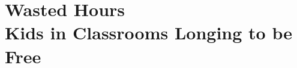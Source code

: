 

\def\thetitle{Wasted Hours\\Kids in Classrooms Longing to be Free}
\def\shorttitle{Wasted Hours}
\def\theauthors{\textit{Parting Thots} by Geoffrey Challen}
\def\shortauthors{Challen}


\pagestyle{document}
\thispagestyle{emptydocument}
\chapter{\thetitle}


